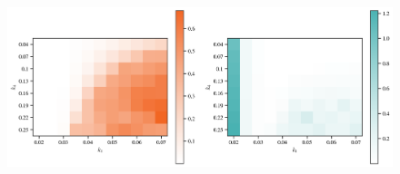 \documentclass{article}
\begin{document}
  \begin{figure}[H]
    \centering
    \includegraphics[width=\textwidth]{figs/meanCs.png}
\end{figure}



% 
\end{document}
